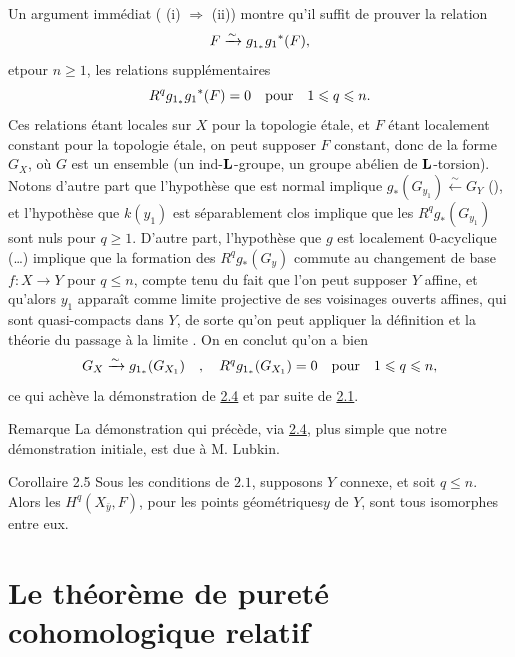 \documentclass[10pt]{../fichiers-configuration-latex/smfart}
\begin{document}
Un argument immédiat ( (i) $\Rightarrow$ (ii)) montre qu'il
suffit de prouver la relation
$$
F\xrightarrow{\sim} g_{1_{\ast}}g_1{}^{\ast}(F){},
$$
et\pageoriginale pour $n\geq 1$, les relations supplémentaires
$$
R^{q}g_{1_{\ast}}g_1{}^{\ast}(F)=0\quad\mbox{\rm pour}\quad 1\leqslant
q\leqslant n{}.
$$
Ces relations étant locales sur $X$ pour la topologie étale, et $F$
étant localement constant pour la topologie étale, on peut supposer
$F$ constant, donc de la forme $G_X$, où $G$ est un ensemble (\resp un
ind-$\mathbf{L}$-groupe, \resp un groupe abélien de
$\mathbf{L}$-torsion). Notons d'autre part que l'hypothèse que  est
normal implique $g_{\ast}(G_{y_1})\xleftarrow{\sim}G_Y$ (),
et l'hypothèse que $k(y_1)$ est séparablement clos implique que les
$R^{q}g_{\ast}(G_{y_1})$ sont nuls pour $q\geq 1$. D'autre part,
l'hypothèse que $g$ est localement $0$-acyclique (\resp\ldots)
implique que la formation des $R^{q}g_{\ast}(G_y)$ commute au
changement de base $f:X\rightarrow Y$ pour $q\leq n$, compte tenu du
fait que l'on peut supposer $Y$ affine, et qu'alors $y_1$ apparaît
comme limite projective de ses voisinages ouverts affines, qui sont
quasi-compacts dans $Y$, de sorte qu'on peut appliquer la définition
 et la théorie du passage à la limite .
On en conclut qu'on a bien
$$
G_X\xrightarrow{\sim} g_{1_{\ast}}(G_{X_1})\quad,\quad
R^{q}g_{1_{\ast}}(G_{X_{1}})=0\quad\mbox{\rm pour}\quad 1\leqslant q\leqslant
n{},
$$
ce qui achève la démonstration de \hyperref[XVI.lem2.4]{2.4} et par suite de \hyperref[XVI.thm2.1]{2.1}.

\begin{enonce*}[remark]{Remarque}
La démonstration qui précède, via \hyperref[XVI.lem2.4]{2.4}, plus simple que notre
démonstration initiale, est due à M. Lubkin.
\end{enonce*}

\begin{enonce*}{Corollaire 2.5}
Sous les conditions de $2.1$, supposons $Y$ connexe, et soit $q\leq
n$. Alors les $H^{q}(X_{\bar{y}},F)$, pour les points
géométriques\pageoriginale $y$ de $Y$, sont tous isomorphes entre eux.
\end{enonce*}

\section{Le théorème de pureté cohomologique relatif}
\end{document}
